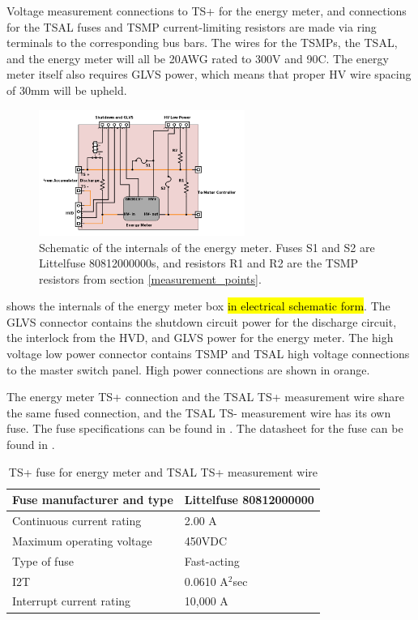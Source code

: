 \documentclass{article}
\DeclareRobustCommand{\hlr}[1]{{\sethlcolor{pink}\hl{#1}}}
\begin{document}
Voltage measurement connections to TS+ for the energy meter, and connections for the TSAL fuses and TSMP current-limiting resistors are made via ring terminals to the corresponding bus bars. The wires for the TSMPs, the TSAL, and the energy meter will all be 20AWG rated to 300V and 90\textdegree C. The energy meter itself also requires GLVS power, which means that proper HV wire spacing of 30mm will be upheld. 



\begin{figure}[H]
\centering
\includegraphics[width=0.6\textwidth]{Energy-Meter-Schematic-w-HVD.png}
\caption{Schematic of the internals of the energy meter. Fuses S1 and S2 are Littelfuse 80812000000s, and resistors R1 and R2 are the TSMP resistors from section \ref{measurement_points}.}
\label{fig:energy_meter_schematic}
\end{figure}

 shows the internals of the energy meter box \hlr{in electrical schematic form}. The GLVS connector contains the shutdown circuit power for the discharge circuit, the interlock from the HVD, and GLVS power for the energy meter. The high voltage low power connector contains TSMP and TSAL high voltage connections to the master switch panel. High power connections are shown in orange.

The energy meter TS+ connection and the TSAL TS+ measurement wire share the same fused connection, and the TSAL TS- measurement wire has its own fuse. The fuse specifications can be found in . The datasheet for the fuse can be found in .

\begin{table}[H]
	\centering
	\begin{tabular}{|l|l|}
	\hline
	Fuse manufacturer and type & Littelfuse 80812000000 \\ \hline
	Continuous current rating & 2.00 A \\ \hline
	Maximum operating voltage & 450VDC \\ \hline
	Type of fuse & Fast-acting \\ \hline
	I2T & 0.0610 A$^{2}$sec \\ \hline
	Interrupt current rating & 10,000 A \\ \hline
	\end{tabular}
	\caption{TS+ fuse for energy meter and TSAL TS+ measurement wire}
	\label{tab:TSAL_and_EM_fuse}
\end{table}
\end{document}
